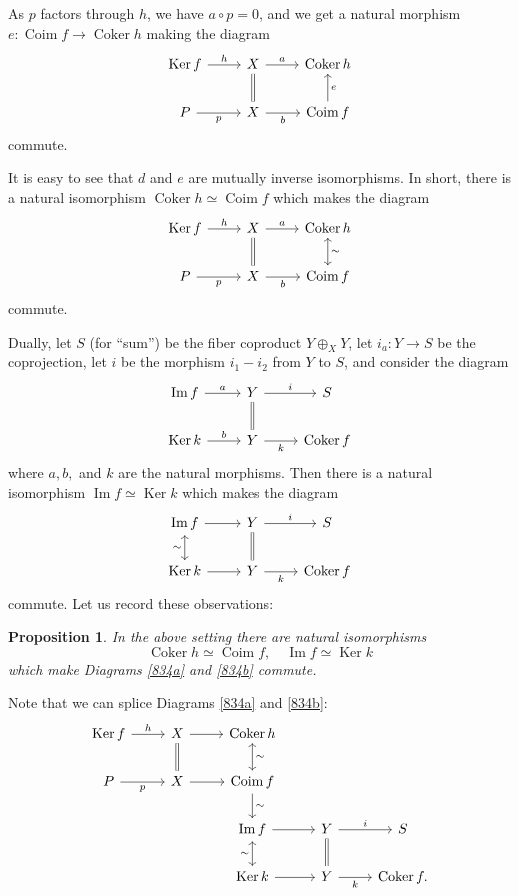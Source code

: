 \documentclass[12pt]{article}
\newtheorem{prop}[thm]{Proposition}
\theoremstyle{remark}
\theoremstyle{definition}
\DeclareMathOperator{\Coim}{Coim}
\DeclareMathOperator{\Coker}{Coker}
\DeclareMathOperator{\Ima}{Im}
\DeclareMathOperator{\Ker}{Ker}
\begin{document}
As $p$ factors through $h$, we have $a\circ p=0$, and we get a natural morphism $e:\Coim f\to\Coker h$ making the diagram 
$$
\begin{tikzcd}
\Ker f\ar{r}{h}&X\ar[equal]{d}\ar{r}{a}&\Coker h\\ 
P\ar{r}[swap]{p}&X\ar{r}[swap]{b}&\Coim f\ar{u}[swap]{e}
\end{tikzcd}
$$ 
commute. 

It is easy to see that $d$ and $e$ are mutually inverse isomorphisms. In short, there is a natural isomorphism $\Coker h\simeq\Coim f$ which makes the diagram
%
\begin{equation}\label{834a}
\begin{tikzcd}
\Ker f\ar{r}{h}&X\ar[equal]{d}\ar{r}{a}&\Coker h\ar[leftrightarrow]{d}{\sim}\\ 
P\ar{r}[swap]{p}&X\ar{r}[swap]{b}&\Coim f
\end{tikzcd}
\end{equation}
%
commute. 

Dually, let $S$ (for ``sum'') be the fiber coproduct $Y\oplus_XY$, let $i_a:Y\to S$ be the coprojection, let $i$ be the morphism $i_1-i_2$ from $Y$ to $S$, and consider the diagram 
%
$$
\begin{tikzcd}
\Ima f\ar{r}{a}&Y\ar[equal]{d}\ar{r}{i}&S\\ 
\Ker k\ar{r}{b}&Y\ar{r}[swap]{k}&\Coker f
\end{tikzcd}
$$ 
where $a,b,$ and $k$ are the natural morphisms. Then there is a natural isomorphism $\Ima f\simeq\Ker k$ which makes the diagram 
%
\begin{equation}\label{834b}
\begin{tikzcd}
\Ima f\ar[leftrightarrow]{d}[swap]{\sim}\ar{r}&Y\ar[equal]{d}\ar{r}{i}&S\\ 
\Ker k\ar{r}&Y\ar{r}[swap]{k}&\Coker f
\end{tikzcd}
\end{equation}
%
commute. Let us record these observations:
\begin{prop}\label{p834}
In the above setting there are natural isomorphisms 
$$
\Coker h\simeq\Coim f,\quad\Ima f\simeq\Ker k
$$ 
which make Diagrams \eqref{834a} and \eqref{834b} commute.
\end{prop}

Note that we can splice Diagrams \eqref{834a} and \eqref{834b}:
$$
\begin{tikzcd}
\Ker f\ar{r}{h} &X\ar[equal]{d}\ar{r}&\Coker h\ar[leftrightarrow]{d}{\sim}\\ 
P\ar{r}[swap]{p}&X\ar{r}             &\Coim f\ar{d}{\sim}\\ 
{}&{}&\Ima f\ar[leftrightarrow]{d}[swap]{\sim}\ar{r}&Y\ar[equal]{d}\ar{r}{i}&S\\ 
{}&{}&\Ker k\ar{r}&Y\ar{r}[swap]{k}&\Coker f.
\end{tikzcd}
$$ 
\end{document}
